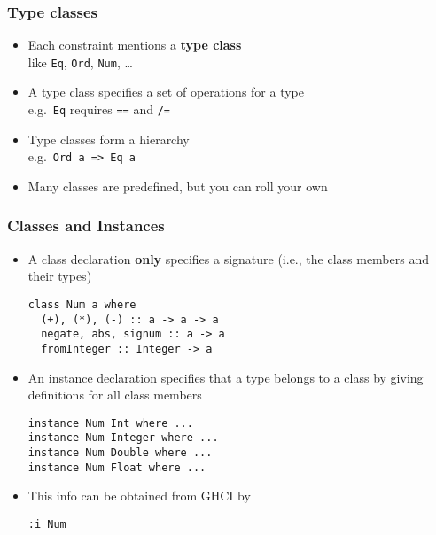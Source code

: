 \documentclass{beamer}
\begin{document}
\begin{frame}[fragile]
  \frametitle{Type classes}
  \begin{itemize}
  \item Each constraint mentions a \textbf{type class}\\
    like \texttt{Eq}, \texttt{Ord}, \texttt{Num}, \dots
  \item A type class specifies a set of operations for a type\\
    e.g.\ \texttt{Eq} requires \texttt{==} and \texttt{/=}
  \item Type classes form a hierarchy\\
    e.g.\ \texttt{Ord a => Eq a}
  \item Many classes are predefined, but you can roll your own
  \end{itemize}
\end{frame}
\begin{frame}[fragile]
  \frametitle{Classes and Instances}
  \begin{itemize}
  \item A class declaration \textbf{only} specifies a signature (i.e., the class members and their types)
\begin{lstlisting}
class Num a where
  (+), (*), (-) :: a -> a -> a
  negate, abs, signum :: a -> a
  fromInteger :: Integer -> a
\end{lstlisting}
  \item An instance declaration specifies that a type belongs to a class by giving definitions for all class members
\begin{lstlisting}
instance Num Int where ...
instance Num Integer where ...
instance Num Double where ...
instance Num Float where ...
\end{lstlisting}
  \item This info can be obtained from GHCI by
\begin{lstlisting}
:i Num 
\end{lstlisting}
  \end{itemize}
\end{frame}
\end{document}
